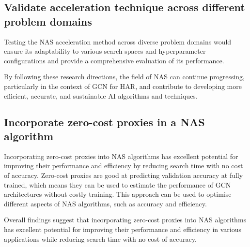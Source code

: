 \subsection{Validate acceleration technique across different problem domains}
Testing the \gls{NAS} acceleration method across diverse problem domains would ensure its adaptability to various search spaces and hyperparameter configurations and provide a comprehensive evaluation of its performance.

By following these research directions, the field of \gls{NAS} can continue progressing, particularly in the context of \gls{GCN} for \gls{HAR}, and contribute to developing more efficient, accurate, and sustainable AI algorithms and techniques.

\subsection{Incorporate zero-cost proxies in a \gls{NAS} algorithm}
Incorporating zero-cost proxies into \gls{NAS} algorithms has excellent potential for improving their performance and efficiency by reducing search time with no cost of accuracy. Zero-cost proxies are good at predicting validation accuracy at fully trained, which means they can be used to estimate the performance of \gls{GCN} architectures without costly training. This approach can be used to optimise different aspects of \gls{NAS} algorithms, such as accuracy and efficiency.
\begin{comment}
This research has practical implications for healthcare and sports science, where accurate and efficient \gls{HAR} is essential for monitoring patient health or athlete performance.     
\end{comment}
Overall findings suggest that incorporating zero-cost proxies into \gls{NAS} algorithms has excellent potential for improving their performance and efficiency in various applications while reducing search time with no cost of accuracy.